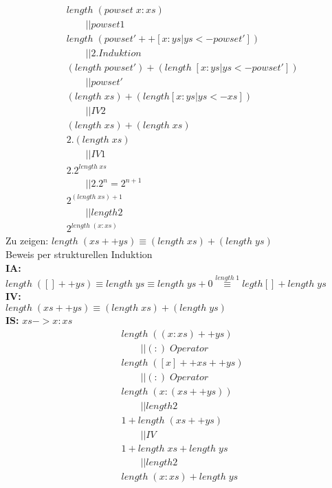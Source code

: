\documentclass[11]{article}
\begin{document}
\begin{align*}
& length \; (powset \; x:xs) \\
& \qquad || powset 1 \\
& length \; (powset' ++ [x:ys|ys <- powset']) \\
& \qquad || 2. Induktion \\
& (length \; powset') + (length \; [x:ys|ys <- powset']) \\
& \qquad || powset' \\
& (length \; xs) + (length [x:ys|ys <- xs]) \\
& \qquad || IV 2 \\
& (length \; xs) + (length \; xs) \\
& 2.(length \; xs) \\
& \qquad || IV 1 \\
& 2.2^{length \; xs} \\
& \qquad || 2.2^{n} = 2^{n+1} \\
& 2^{(length \; xs) + 1} \\
& \qquad || length 2 \\
& 2^{length \; (x:xs)}
\end{align*}
%
Zu zeigen: $length \; (xs ++ ys) \equiv (length \; xs) + (length \; ys)$ \\
Beweis per strukturellen Induktion \\
\textbf{IA: } \\
$length \; ([] ++ ys) \equiv length \; ys \equiv length \; ys + 0 \stackrel{length \; 1}{\equiv} legth []+ length \; ys$ \\
\textbf{IV:} \\
$length \; (xs ++ ys) \equiv (length \; xs) + (length \; ys)$ \\
\textbf{IS: } $xs -> x:xs$ \\
\begin{equation*}
\begin{aligned}
& length \; ((x:xs) ++ ys) \\
& \qquad || (:) \; Operator \\
& length \; ([x] ++ xs ++ ys) \\
& \qquad || (:) \; Operator \\
& length \; (x:(xs++ys)) \\
& \qquad  || length 2 \\
& 1 + length \; (xs ++ ys) \\
& \qquad || IV \\
& 1 + length \; xs + length \; ys \\
& \qquad || length 2 \\
& length \; (x:xs) + length \; ys
\end{aligned}
\end{equation*}
\end{document}

